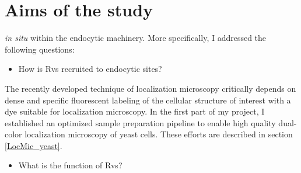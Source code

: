 
\chapter{Aims of the study} %

\label{Ch:Aims} %


 \textit{in situ} within the endocytic machinery. More specifically, I addressed the following questions:

\begin{itemize}
	\item How is Rvs recruited to endocytic sites? 
\end{itemize}

The recently developed technique of localization microscopy critically depends on dense and specific fluorescent labeling of the cellular structure of interest with a dye suitable for localization microscopy. In the first part of my project, I established an optimized sample preparation pipeline to enable high quality dual-color localization microscopy of yeast cells. These efforts are described in section \ref{LocMic_yeast}.

\begin{itemize}
	\item What is the function of Rvs?
\end{itemize}
